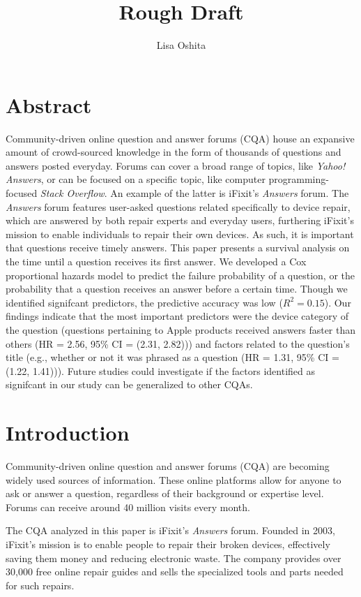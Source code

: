 \documentclass[12pt]{article}
\title{Rough Draft}
\author{Lisa Oshita}
\date{}
\begin{document}
\maketitle

\section{Abstract}

Community-driven online question and answer forums (CQA) house an expansive amount of crowd-sourced knowledge in the form of thousands of questions and answers posted everyday. Forums can cover a broad range of topics, like \textit{Yahoo! Answers}, or can be focused on a specific topic, like computer programming-focused \textit{Stack Overflow}. An example of the latter is iFixit's \textit{Answers} forum. The \textit{Answers} forum features user-asked questions related specifically to device repair, which are answered by both repair experts and everyday users, furthering iFixit's mission to enable individuals to repair their own devices. As such, it is important that questions receive timely answers. This paper presents a survival analysis on the time until a question receives its first answer. We developed a Cox proportional hazards model to predict the failure probability of a question, or the probability that a question receives an answer before a certain time. Though we identified signifcant predictors, the predictive accuracy was low ($R^2 = 0.15$). Our findings indicate that the most important predictors were the device category of the question (questions pertaining to Apple products received answers faster than others (HR = 2.56, 95\% CI = (2.31, 2.82))) and factors related to the question's title (e.g., whether or not it was phrased as a question (HR = 1.31, 95\% CI = (1.22, 1.41))). Future studies could investigate if the factors identified as signifcant in our study can be generalized to other CQAs. 

\section{Introduction}

    Community-driven online question and answer forums (CQA) are becoming widely used sources of information. These online platforms allow for anyone to ask or answer a question, regardless of their background or expertise level. Forums can receive around 40 million visits every month.
    
    The CQA analyzed in this paper is iFixit's \textit{Answers} forum. Founded in 2003, iFixit's mission is to enable people to repair their broken devices, effectively saving them money and reducing electronic waste. The company provides over 30,000 free online repair guides and sells the specialized tools and parts needed for such repairs.
    
\end{document}
